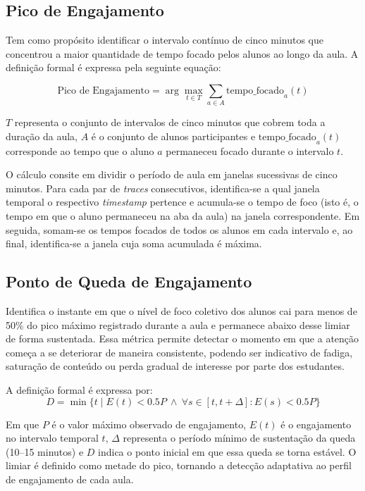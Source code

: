 \subsection{Pico de Engajamento}
Tem como propósito identificar o intervalo contínuo de cinco minutos que concentrou a maior quantidade de tempo focado pelos alunos ao longo da aula. A definição formal é expressa pela seguinte equação:

\begin{equation}\label{eq:peak_engagement}
\text{Pico de Engajamento} = \arg\max_{t \in T} \sum_{a \in A} \text{tempo\_focado}_a(t)
\end{equation}

$T$ representa o conjunto de intervalos de cinco minutos que cobrem toda a duração da aula, $A$ é o conjunto de alunos participantes e $\text{tempo\_focado}_a(t)$ corresponde ao tempo que o aluno $a$ permaneceu focado durante o intervalo $t$.

O cálculo consite em dividir o período de aula em janelas sucessivas de cinco minutos. Para cada par de \textit{traces} consecutivos, identifica-se a qual janela temporal o respectivo \textit{timestamp} pertence e acumula-se o tempo de foco (isto é, o tempo em que o aluno permaneceu na aba da aula) na janela correspondente. Em seguida, somam-se os tempos focados de todos os alunos em cada intervalo e, ao final, identifica-se a janela cuja soma acumulada é máxima. 

\subsection{Ponto de Queda de Engajamento}

Identifica o instante em que o nível de foco coletivo dos alunos cai para menos de 50\% do pico máximo registrado durante a aula e permanece abaixo desse limiar de forma sustentada. Essa métrica permite detectar o momento em que a atenção começa a se deteriorar de maneira consistente, podendo ser indicativo de fadiga, saturação de conteúdo ou perda gradual de interesse por parte dos estudantes.

A definição formal é expressa por:
\begin{equation}
D = \min\{t \mid E(t) < 0.5P \ \land \ \forall s \in [t,t+\Delta]: E(s) < 0.5P \}
\end{equation}

Em que $P$ é o valor máximo observado de engajamento, $E(t)$ é o engajamento no intervalo temporal $t$, $\Delta$ representa o período mínimo de sustentação da queda (10--15 minutos) e $D$ indica o ponto inicial em que essa queda se torna estável. O limiar é definido como metade do pico, tornando a detecção adaptativa ao perfil de engajamento de cada aula.

